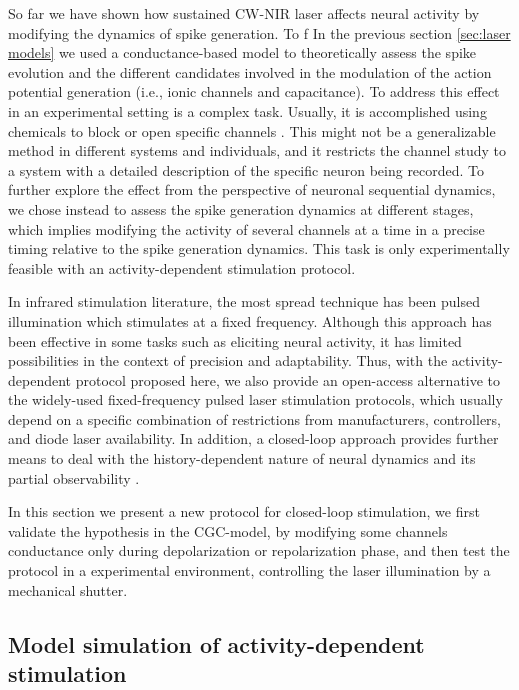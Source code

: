 So far we have shown how sustained CW-NIR laser affects neural activity by modifying the dynamics of spike generation. To f In the previous section \ref{sec:laser models} we used a conductance-based model to theoretically assess the spike evolution and the different candidates involved in the modulation of the action potential generation (i.e., ionic channels and capacitance). To address this effect in an experimental setting is a complex task. Usually, it is accomplished using chemicals to block or open specific channels \parencite{liang_temperaturedependent_2009}. This might not be a generalizable method in different systems and individuals, and it restricts the channel study to a system with a detailed description of the specific neuron being recorded. To further explore the effect from the perspective of neuronal sequential dynamics, we chose instead to assess the spike generation dynamics at different stages, which implies modifying the activity of several channels at a time in a precise timing relative to the spike generation dynamics. This task is only experimentally feasible with an activity-dependent stimulation protocol.

In infrared stimulation literature, the most spread technique has been pulsed illumination which stimulates at a fixed frequency. Although this approach has been effective in some tasks such as eliciting neural activity, it has limited possibilities in the context of precision and adaptability. Thus, with the activity-dependent protocol proposed here, we also provide an open-access alternative to the widely-used fixed-frequency pulsed laser stimulation protocols, which usually depend on a specific combination of restrictions from manufacturers, controllers, and diode laser availability. In addition, a closed-loop approach provides further means to deal with the history-dependent nature of neural dynamics and its partial observability \parencite{varona_online_2016}. 

In this section we present a new protocol for closed-loop stimulation, we first validate the hypothesis in the CGC-model, by modifying some channels conductance only during depolarization or repolarization phase, and then test the protocol in a experimental environment, controlling the laser illumination by a mechanical shutter. 


\subsection{Model simulation of activity-dependent stimulation}

